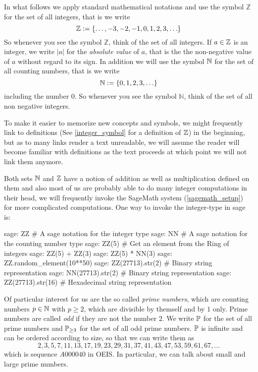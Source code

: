 In what follows we apply standard mathematical notations and use the symbol $\mathbb{Z}$ for the set of all integers, that is we write
\begin{equation}
\label{integer_symbol}
\mathbb{Z} := \{\ldots, -3,-2,-1,0,1,2,3,\ldots\}
\end{equation}
So whenever you see the symbol $\mathbb{Z}$, think of the set of all integers. If $a \in \mathbb{Z}$ is an integer, we write $|a|$ for the \textit{absolute value} of $a$, that is the the non-negative value of $a$ without regard to its sign. In addition we will use the symbol $\mathbb{N}$ for the set of all counting numbers, that is we write 
\begin{equation}
\label{integer_symbol}
\mathbb{N} := \{0,1,2,3,\ldots\}
\end{equation}
including the number $0$. So whenever you see the symbol $\mathbb{N}$, think of the set of all non negative integers. 

To make it easier to memorize new concepts and symbols, we might frequently link to definitions (See \ref{integer_symbol} for a definition of $\mathbb{Z}$) in the beginning, but as to many links render a text unreadable, we will assume the reader will become familiar with definitions as the text proceeds at which point we will not link them anymore. 

Both sets $\mathbb{N}$ and $\mathbb{Z}$ have a notion of addition as well as multiplication defined on them and also most of us are probably able to do many integer computations in their head, we will frequently invoke the SageMath system (\ref{sagemath_setup}) for more complicated computations. One way to invoke the integer-type in sage is:
\begin{sagecommandline}
sage: ZZ # A sage notation for the integer type
sage: NN # A sage notation for the counting number type
sage: ZZ(5) # Get an element from the Ring of integers
sage: ZZ(5) + ZZ(3)
sage: ZZ(5) * NN(3)
sage: ZZ.random_element(10**50)
sage: ZZ(27713).str(2) # Binary string representation
sage: NN(27713).str(2) # Binary string representation
sage: ZZ(27713).str(16) # Hexadecimal string representation
\end{sagecommandline}
Of particular interest for us are the so called \textit{prime numbers}, which are counting numbers $ p \in \mathbb{N} $ with $ p \geq 2 $, which are divisible by themself and by $ 1 $ only. Prime numbers are called \textit{odd} if they are not the number $ 2 $. We write $ \mathbb{P} $ for the set of all prime numbers and $ \mathbb{P} _{\geq 3} $ for the set of all odd prime numbers.
$\mathbb{P}$ is infinite and can be ordered according to size, so that we can write them as
\begin{equation}
\label{eq: primenumber_sequence}
2, 3, 5, 7, 11, 13, 17, 19, 23, 29, 31, 37, 41, 43, 47, 53, 59, 61, 67, \ldots
\end{equation}
which is sequence $ A000040 $ in OEIS. In particular, we can talk about small and large prime numbers.

